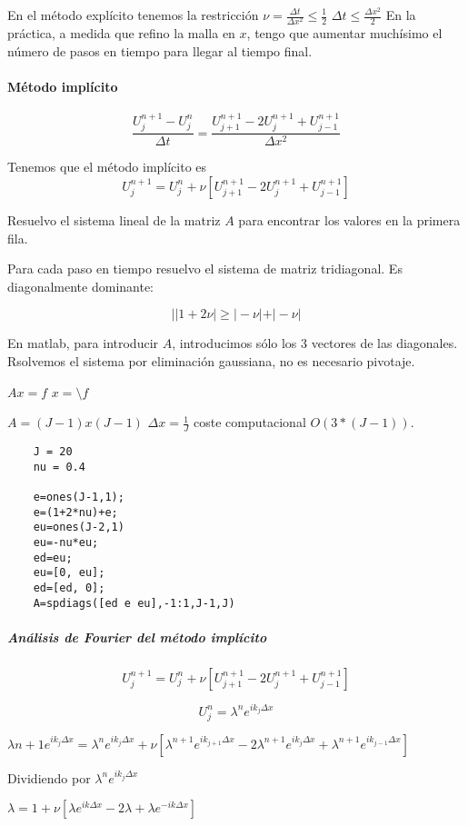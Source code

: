  En el método explícito tenemos la restricción $\nu=\frac{\Delta t}{\Delta x ^2} \le \frac{1}{2}$
 $\Delta t \le \frac{\Delta x ^2}{2}$ En la práctica, a medida que refino la malla en $x$, tengo que aumentar muchísimo el número de pasos en tiempo para llegar al tiempo final.
 
\paragraph{Método implícito}
$$\frac{U_j^{n+1}-U_j^n}{\Delta t} = \frac{U_{j+1}^{n+1}-2U_{j}^{n+1}+U_{j-1}^{n+1}}{\Delta x^2}$$

Tenemos que el método implícito es
$$U_j^{n+1} = U_j^n + \nu \left[U_{j+1}^{n+1}-2U_{j}^{n+1}+U_{j-1}^{n+1}\right]$$



Resuelvo el sistema lineal de la matriz $A$ para encontrar los valores en la primera fila.

Para cada paso en tiempo resuelvo el sistema de matriz tridiagonal. Es diagonalmente dominante:

$$||1+2\nu|\ge |-\nu|+|-\nu|$$

En matlab, para introducir $A$, introducimos sólo los 3 vectores de las diagonales. Rsolvemos el sistema por eliminación gaussiana, no es necesario pivotaje.

$Ax =f$
$x=\setminus f$

$A=(J-1)x(J-1)$
$\Delta x = \frac{1}{J}$
coste computacional $O(3*(J-1))$.

\begin{lstlisting}
	J = 20
	nu = 0.4
	
	e=ones(J-1,1);
	e=(1+2*nu)+e;
	eu=ones(J-2,1)
	eu=-nu*eu;
	ed=eu;
	eu=[0, eu];
	ed=[ed, 0];
	A=spdiags([ed e eu],-1:1,J-1,J)
\end{lstlisting}

\subparagraph*{Análisis de Fourier del método implícito}

$$U_j^{n+1} = U_j^n + \nu \left[U_{j+1}^{n+1} - 2U_j^{n+1}+U_{j-1}^{n+1}\right]$$

$$U_j^n = \lambda^n e^{ik_j\Delta x}$$

$\lambda{n+1} e^{ik_j\Delta x} = \lambda^n e^{ik_j\Delta x} + \nu \left[\lambda^{n+1}e^{ik_{j+1}\Delta x} - 2\lambda^{n+1}e^{ik_j\Delta x}+\lambda^{n+1}e^{ik_{j-1}\Delta x}\right]$

Dividiendo por $\lambda^n e^{ik_j\Delta x}$

$\lambda = 1+\nu\left[\lambda e^{ik\Delta x}-2\lambda + \lambda e^{-ik\Delta x}\right]$

